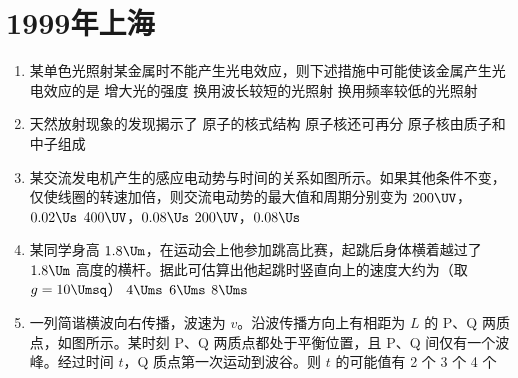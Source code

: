 \documentclass[\gkver]{gaokaozhenti}
\begin{document}
\chapter{1999年上海}

\begin{enumerate}
\item
某单色光照射某金属时不能产生光电效应，则下述措施中可能使该金属产生光电效应的是
{增大光的强度}
{换用波长较短的光照射}
{换用频率较低的光照射}

\item
天然放射现象的发现揭示了
{原子的核式结构}
{原子核还可再分}
{原子核由质子和中子组成}

\item
某交流发电机产生的感应电动势与时间的关系如图所示。如果其他条件不变，仅使线圈的转速加倍，则交流电动势的最大值和周期分别变为
\onepicture[w=6cm]{}
{$200\UV$，$0.02\Us$}
{$400\UV$，$0.08\Us$}
{$200\UV$，$0.08\Us$}

\item
某同学身高 $1.8\Um$，在运动会上他参加跳高比赛，起跳后身体横着越过了 $1.8\Um$ 高度的横杆。据此可估算出他起跳时竖直向上的速度大约为（取 $g = 10\Umsq$）
\fourchoices[answer=B]
{$2\Ums$}
{$4\Ums$}
{$6\Ums$}
{$8\Ums$}

\item
一列简谐横波向右传播，波速为 $v$。沿波传播方向上有相距为 $L$ 的 P、Q 两质点，如图所示。某时刻 P、Q 两质点都处于平衡位置，且 P、Q 间仅有一个波峰。经过时间 $t$，Q 质点第一次运动到波谷。则 $t$ 的可能值有
\onepicture[w=5cm]{}
{2 个}
{3 个}
{4 个}


\end{enumerate}
\end{document}
